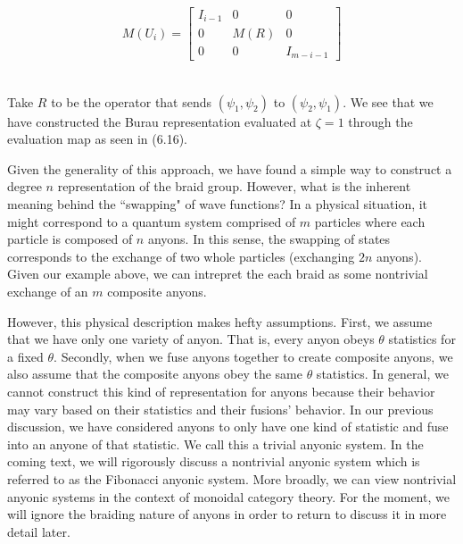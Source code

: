 \begin{equation}
	\begin{aligned}
		M(U_i) = \begin{bmatrix}
						I_{i-1} & 0 & 0 \\
						0 & M(R) & 0 \\
						0 & 0 & I_{m - i - 1}
					\end{bmatrix}
	\end{aligned}
\end{equation}\\


\begin{example}\end{example}Take $R$ to be the operator that sends $(\psi_1,\psi_2)$ to $(\psi_2,\psi_1)$. We see that we have constructed the Burau representation evaluated at $\zeta=1$ through the evaluation map as seen in (6.16).

Given the generality of this approach, we have found a simple way to construct a degree $n$ representation of the braid group. However, what is the inherent meaning behind the ``swapping" of wave functions? In a physical situation, it might correspond to a quantum system comprised of $m$ particles where each particle is composed of $n$ anyons. In this sense, the swapping of states corresponds to the exchange of two whole particles (exchanging $2n$ anyons). Given our example above, we can intrepret the each braid as some nontrivial exchange of an $m$ composite anyons. 

However, this physical description makes hefty assumptions. First, we assume that we have only one variety of anyon. That is, every anyon obeys $\theta$ statistics for a fixed $\theta$. Secondly, when we fuse anyons together to create composite anyons, we also assume that the composite anyons obey the same $\theta$ statistics. In general, we cannot construct this kind of representation for anyons because their behavior may vary based on their statistics and their fusions' behavior. In our previous discussion, we have considered anyons to only have one kind of statistic and fuse into an anyone of that statistic. We call this a trivial anyonic system. In the coming text, we will rigorously discuss a nontrivial anyonic system which is referred to as the Fibonacci anyonic system. More broadly, we can view nontrivial anyonic systems in the context of monoidal category theory. For the moment, we will ignore the braiding nature of anyons in order to return to discuss it in more detail later.


